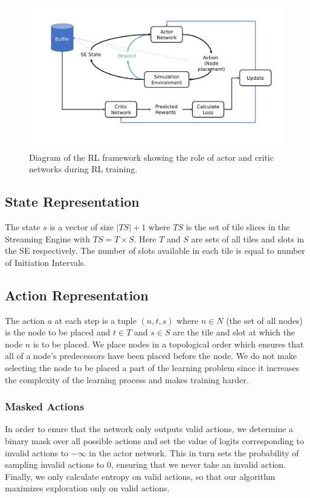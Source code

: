 \begin{figure}[tb]
  \centering
  \includegraphics[trim=15 30 20 20, clip, width=\linewidth]{fig/ppo.pdf}
  \caption{Diagram of the RL framework showing the role of actor and critic networks during RL training. }
  \label{fig:ppo}
\end{figure}

\subsection{State Representation}
The state $s$ is a vector of size $|TS|+1$ where $TS$ is the set of tile slices in the Streaming Engine with $TS=T \times S$. 
Here $T$ and $S$ are sets of all tiles and slots in the SE respectively. 
The number of slots available in each tile is equal to number of Initiation Intervals.

\subsection{Action Representation}
The action $a$ at each step is a tuple \((n,t,s)\) where $n \in N$ (the set of all nodes) is the node to be placed and $t \in T$ and $s \in S$ are the tile and slot at which the node $n$ is to be placed. 
We place nodes in a topological order which ensures that all of a node's predecessors have been placed before the node. 
We do not make selecting the node to be placed a part of the learning problem since it increases the complexity of the learning process and makes training harder.

\subsubsection{Masked Actions}
In order to enure that the network only outputs valid actions, we determine a binary mask over all possible actions and set the value of logits corresponding to invalid actions to $-\infty$ in the actor network. 
This in turn sets the probability of sampling invalid actions to $0$, ensuring that we never take an invalid action.
Finally, we only calculate entropy on valid actions, so that our algorithm maximizes exploration only on valid actions.

